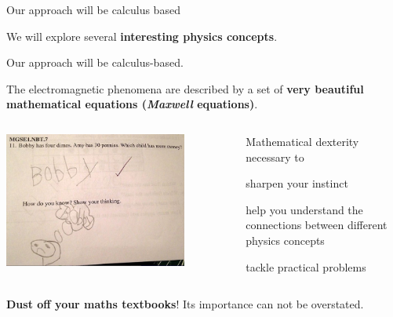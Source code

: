 \begin{frame}{Our approach will be calculus based}

\begin{itemize}
{
      \item We will explore several {\bf interesting physics concepts}.
      \item Our approach will be calculus-based.
      \item The electromagnetic phenomena are described by a set of {\bf very beautiful
                mathematical equations ({\em Maxwell} equations)}.
}
\end{itemize}


\begin{columns}
  \begin{column}{0.45\textwidth}
   \begin{center}
     \includegraphics[width=0.80\textwidth]{./images/photos/bobby.png}\\
   \end{center}
  \end{column}
  \begin{column}{0.55\textwidth}
  {\small
         Mathematical dexterity necessary to
         \begin{itemize}
          { \small
                 \item sharpen your instinct
                 \item help you understand the connections between
                   different physics concepts
                  \item tackle practical problems
          }
         \end{itemize}
   }
  \end{column}
\end{columns}

\vspace{0.25cm}
{\bf Dust off your maths textbooks}! Its importance can not be overstated.\\

\end{frame}


